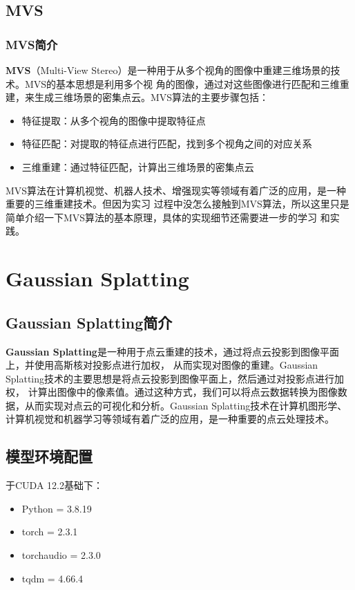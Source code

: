 \documentclass{nwputhesis}
\begin{document}
\subsection{MVS}
\subsubsection{MVS简介}
\textbf{MVS}（Multi-View Stereo）是一种用于从多个视角的图像中重建三维场景的技术。MVS的基本思想是利用多个视
角的图像，通过对这些图像进行匹配和三维重建，来生成三维场景的密集点云。MVS算法的主要步骤包括：
\begin{itemize}
    \item 特征提取：从多个视角的图像中提取特征点
    \item 特征匹配：对提取的特征点进行匹配，找到多个视角之间的对应关系
    \item 三维重建：通过特征匹配，计算出三维场景的密集点云
\end{itemize}

\indent
MVS算法在计算机视觉、机器人技术、增强现实等领域有着广泛的应用，是一种重要的三维重建技术。但因为实习
过程中没怎么接触到MVS算法，所以这里只是简单介绍一下MVS算法的基本原理，具体的实现细节还需要进一步的学习
和实践。

\makespace
\section{Gaussian Splatting}
\subsection{Gaussian Splatting简介}
\textbf{Gaussian Splatting}是一种用于点云重建的技术，通过将点云投影到图像平面上，并使用高斯核对投影点进行加权，
从而实现对图像的重建。Gaussian Splatting技术的主要思想是将点云投影到图像平面上，然后通过对投影点进行加权，
计算出图像中的像素值。通过这种方式，我们可以将点云数据转换为图像数据，从而实现对点云的可视化和分析。Gaussian
Splatting技术在计算机图形学、计算机视觉和机器学习等领域有着广泛的应用，是一种重要的点云处理技术。
\subsection{模型环境配置}
\noindent
于CUDA 12.2基础下：
\begin{itemize}
    \item Python = 3.8.19
    \item torch = 2.3.1
    \item torchaudio = 2.3.0
    \item tqdm = 4.66.4
\end{itemize}
\end{document}
